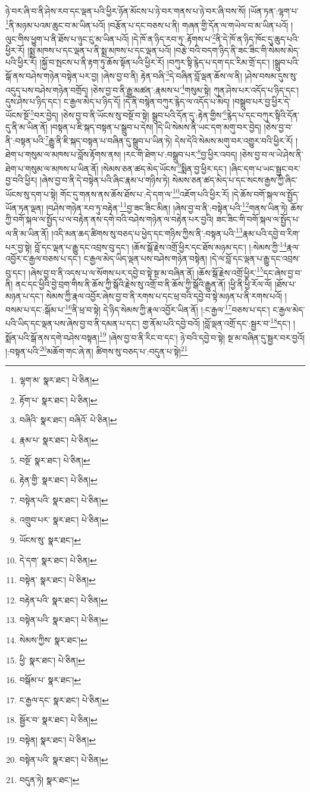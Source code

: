 ཉེ་བར་ཞི་བ་ནི་ཤེས་རབ་དང་ལྡན་པའི་ཕྱིར་ཉོན་མོངས་པ་ཉེ་བར་གནས་པ་ཉེ་བར་ཞི་བས་སོ། །ཡོན་ཏན་:ལྷག་པ་\footnote{ལྷག་མ་  སྣར་ཐང་།  པེ་ཅིན། }ནི་མཉམ་པའམ་ཆུང་བ་མ་ཡིན་པའོ། །བརྩོན་པ་དང་བཅས་པ་ནི། གཞན་གྱི་དོན་ལ་གཡེལ་བ་མ་ཡིན་པའོ། །ལུང་གིས་ཕྱུག་པ་ནི་ཐོས་པ་ཉུང་ངུ་མ་ཡིན་པའོ། །དེ་ཁོ་ན་ཉིད་རབ་ཏུ་:རྟོགས་པ་\footnote{རྟོག་པ་  སྣར་ཐང་།  པེ་ཅིན། }ནི་དེ་ཁོ་ན་ཉིད་ཁོང་དུ་ཆུད་པའི་ཕྱིར་རོ། །སྨྲ་མཁས་པ་དང་ལྡན་པ་ནི་སྨྲ་མཁས་པ་དང་ལྡན་པའོ། །བརྩེ་བའི་བདག་ཉིད་ནི་ཟང་ཟིང་གི་སེམས་མེད་པའི་ཕྱིར་རོ། །སྐྱོ་བ་སྤངས་པ་ནི་རྟག་ཏུ་ཆོས་སྟོན་པའི་ཕྱིར་རོ། །བཀུར་སྟི་རྙེད་པ་དག་དང་རིམ་གྲོ་དང་། །སྒྲུབ་པའི་སྒོ་ནས་བཤེས་གཉེན་བསྟེན་པར་བྱ། །ཞེས་བྱ་བ་ནི། རྟེན་བཞི་\footnote{བཞིའི་  སྣར་ཐང་། བཞིའོ་  པེ་ཅིན། }དེ་བཞིན་བློ་ལྡན་ཆོས་ལ་ནི། །ཤེས་བསམ་དུས་སུ་འདུད་པས་བཤེས་གཉེན་བགྲོད། །ཅེས་བྱ་བ་ནི་རྒྱུ་མཚན་:རྣམས་པ་\footnote{རྣམ་པ་  སྣར་ཐང་།  པེ་ཅིན། }གསུམ་སྟེ། ཀུན་ཤེས་པར་འདོད་པ་ཉིད་དང་། དུས་ཤེས་པ་ཉིད་དང་། ང་རྒྱལ་མེད་པ་ཉིད་དོ། །དེ་ནི་བསྙེན་བཀུར་རྙེད་ལ་འདོད་པ་མེད། །བསྒྲུབ་པར་བྱ་ཕྱིར་དེ་ཡོངས་སྔོ་\footnote{བསྔོ་  སྣར་ཐང་།  པེ་ཅིན། }བར་བྱེད། །ཅེས་བྱ་བ་ནི་ཡོངས་སུ་བསྔོ་བ་སྟེ། སྒྲུབ་པའི་དོན་དུ་:རྟེན་གྱིས་\footnote{རྟེན་གྱི་  སྣར་ཐང་།  པེ་ཅིན། }རྙེད་པ་དང་བཀུར་སྟིའི་དོན་དུ་ནི་མ་ཡིན་ནོ། །བསྟན་པ་ཇི་སྐད་བསྟན་པ་སྒྲུབ་པ་དེས། །དེ་ཡི་སེམས་ནི་ཡང་དག་མགུ་བར་བྱེད། །ཅེས་བྱ་བ་ནི་:བསྟན་པའི་\footnote{བསྟེན་པའི་  སྣར་ཐང་།  པེ་ཅིན། }རྒྱུ་ནི་ཇི་སྐད་བསྟན་པ་བཞིན་དུ་སྒྲུབ་པ་ཡིན་ཏེ། དེས་དེའི་སེམས་མགུ་བར་འགྱུར་བའི་ཕྱིར་རོ། །ཐེག་པ་གསུམ་ལ་མཁས་པ་བློས་རྟོགས་ནས། །རང་གི་ཐེག་པ་:བསྒྲུབ་པར་\footnote{འགྲུབ་པར་  སྣར་ཐང་།  པེ་ཅིན། }བྱ་ཕྱིར་འབད། །ཅེས་བྱ་བ་ལ་ཡེ་ཤེས་ནི་ཐེག་པ་གསུམ་ལ་མཁས་པ་ཡིན་ནོ། །སེམས་ཅན་ཚད་མེད་ཡོངས་\footnote{ཡོངས་སུ་  སྣར་ཐང་། }སྨིན་བྱ་ཕྱིར་དང་། །ཞིང་དག་པ་ཡང་སྦྱང་བར་བྱ་བའི་ཕྱིར། །ཞེས་བྱ་བ་ནི་དེ་བསྟེན་པའི་ཞིང་རྣམ་པ་གཉིས་ཏེ། སེམས་ཅན་ཚད་མེད་པ་དང་སངས་རྒྱས་ཀྱི་ཞིང་ཡོངས་སུ་དག་པ་སྟེ། གོང་དུ་གནས་ནས་ཆོས་ཐོས་པ་:དེ་དག་ལ་\footnote{དེ་དག་  སྣར་ཐང་།  པེ་ཅིན། }འཇོག་པའི་ཕྱིར་རོ། །དེ་ཆོས་བགོ་སྐལ་ལ་སྤྱོད་ཡོན་ཏན་ལྡན། །བཤེས་གཉེན་རབ་ཏུ་བརྟེན་\footnote{བསྟེན་  སྣར་ཐང་།  པེ་ཅིན། }བྱ་ཟང་ཟིང་མིན། །ཞེས་བྱ་བ་ནི་:བསྟེན་པའི་\footnote{བརྟེན་པའི་  སྣར་ཐང་།  པེ་ཅིན། }གནས་ཡིན་ཏེ། ཆོས་ཀྱི་བགོ་སྐལ་ལ་སྤྱོད་པ་ལ་བརྟེན་ནས་དགེ་བའི་བཤེས་གཉེན་ལ་བརྟེན་པར་བྱའི། ཟང་ཟིང་གི་བགོ་སྐལ་ལ་སྤྱོད་པ་ལ་ནི་མ་ཡིན་ནོ། །འདི་མན་ཆད་ཚིགས་སུ་བཅད་པ་ཕྱེད་དང་གཉིས་ཀྱིས་ནི་:བསྟན་པའི་\footnote{བསྟེན་པའི་  སྣར་ཐང་།  པེ་ཅིན། }རྣམ་པའི་དབྱེ་བ་རིག་པར་བྱ་སྟེ། བློ་དང་ལྡན་པ་རྒྱུ་དང་འབྲས་བུ་དང་། །ཆོས་སྒོ་རྗེས་འགྲོ་ཕྱིར་དང་ཐོས་མཉམ་དང་། །:སེམས་ཀྱི་\footnote{སེམས་ཀྱིས་  སྣར་ཐང་། }རྣལ་འབྱོར་ང་རྒྱལ་བཅས་པ་དང་། ང་རྒྱལ་མེད་ཡིད་ལྡན་པས་བཤེས་གཉེན་བསྟེན། །དེ་ལ་བློ་དང་ལྡན་པ་རྒྱུ་དང་འབྲས་བུ་དང་། །ཞེས་བྱ་བ་ནི་འདས་པ་ལ་སོགས་པར་དབྱེ་བ་སྟེ་སྔ་མ་བཞིན་ནོ། །ཆོས་སྒོ་རྗེས་འགྲོ་ཕྱིར་\footnote{ཕྱི་  སྣར་ཐང་།  པེ་ཅིན། }དང་ཞེས་བྱ་བ་ནི། ནང་དང་ཕྱིའི་བྱེ་བྲག་གིས་ནི་ཆོས་ཀྱི་སྒོའི་རྗེས་སུ་འགྲོ་བ་ནི་ཆོས་ཀྱི་སྒོའི་རྒྱུན་ནོ། །ཕྱི་ནི་ཕྱི་རོལ་ལོ། །ཐོས་པ་མཉན་པ་དང་། སེམས་ཀྱི་རྣལ་འབྱོར་ཞེས་བྱ་བ་ནི་རགས་པ་དང་ཕྲ་བའི་དབྱེ་བ་སྟེ་མཉན་པ་ནི་རགས་པའོ། །བསམ་པ་དང་:སྒོམ་པ་\footnote{བསྒོམ་པ་  སྣར་ཐང་། }ནི་ཕྲ་བ་སྟེ། དེ་ཉིད་སེམས་ཀྱི་རྣལ་འབྱོར་ཡིན་ནོ། །:ང་རྒྱལ་\footnote{ང་རྒྱལ་དང་  སྣར་ཐང་།  པེ་ཅིན། }བཅས་པ་དང་། ང་རྒྱལ་མེད་པའི་ཡིད་དང་ལྡན་པས་ཞེས་བྱ་བ་ནི་དམན་པ་དང་། གྱ་ནོམ་པའི་དབྱེ་བའོ། །བློ་ལྡན་འགྲོ་དང་:སྦྱར་བ་\footnote{སྦྱོར་བ་  སྣར་ཐང་།  པེ་ཅིན། }དང་། །སྨོན་པའི་སྒོ་ནས་དགེ་བཤེས་བསྟན།\footnote{བསྟེན།  སྣར་ཐང་།  པེ་ཅིན། } །ཞེས་བྱ་བ་ནི་རིང་བ་དང་། ཉེ་བའི་དབྱེ་བ་སྟེ། སྔ་མ་བཞིན་དུ་སྦྱར་བར་བྱའོ། །:བསྟན་པའི་\footnote{བསྟེན་པའི་  སྣར་ཐང་།  པེ་ཅིན། }མཆོག་གང་ཞེ་ན། ཚིགས་སུ་བཅད་པ་:བདུན་པ་སྟེ།\footnote{བདུན་ཏེ།  སྣར་ཐང་། } 
